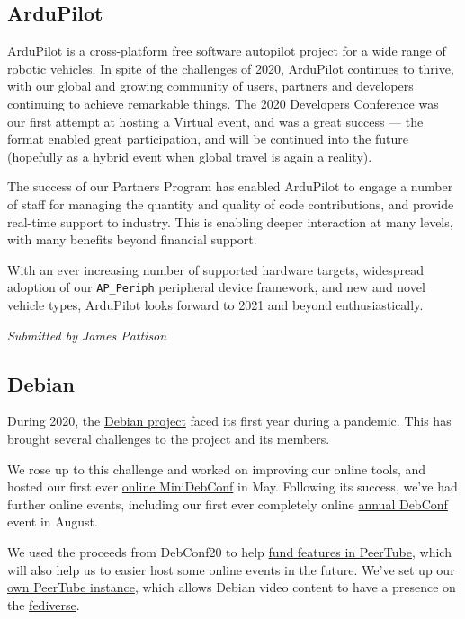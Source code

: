 \documentclass[a4paper]{report}
\begin{document}
\subsection{ArduPilot}

\href{https://ardupilot.org/}{ArduPilot} is a cross-platform free software autopilot project for a wide range of robotic vehicles. In spite of the challenges of 2020, ArduPilot continues to thrive, with our global and growing community of users, partners and developers continuing to achieve remarkable things. The 2020 Developers Conference was our first attempt at hosting a Virtual event, and was a great success --- the format enabled great participation, and will be continued into the future (hopefully as a hybrid event when global travel is again a reality).

The success of our Partners Program has enabled ArduPilot to engage a number of staff for managing the quantity and quality of code contributions, and provide real-time support to industry. This is enabling deeper interaction at many levels, with many benefits beyond financial support.

With an ever increasing number of supported hardware targets, widespread adoption of our \texttt{AP\_Periph} peripheral device framework, and new and novel vehicle types, ArduPilot looks forward to 2021 and beyond enthusiastically.

{\em Submitted by James Pattison}

\subsection{Debian}

During 2020, the \href{https://www.debian.org/}{Debian project} faced its first year during a pandemic.  This has brought several challenges to the project and its members.

We rose up to this challenge and worked on improving our online tools, and hosted our first ever \href{https://wiki.debian.org/DebianEvents/internet/2020/MiniDebConfOnline}{online MiniDebConf} in May. Following its success, we've had further online events, including our first ever completely online \href{https://debconf20.debconf.org/}{annual DebConf} event in August.

We used the proceeds from DebConf20 to help \href{https://bits.debian.org/2020/10/debian-donation-peertube.html}{fund features in PeerTube}, which will also help us to easier host some online events in the future. We've set up our \href{https://peertube.debian.social}{own PeerTube instance}, which allows
Debian video content to have a presence on the \href{https://en.wikipedia.org/wiki/Fediverse}{fediverse}.
\end{document}
